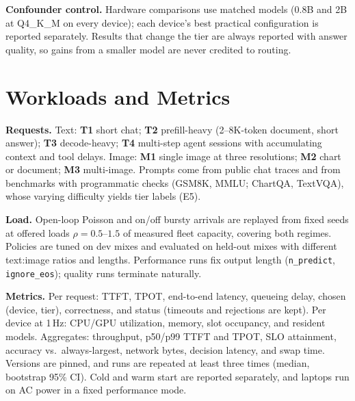 \documentclass[10pt,twocolumn,letterpaper]{article}
\newcommand{\para}[1]{\textbf{#1}\hspace{0.4em}}
\begin{document}
\para{Confounder control.} Hardware comparisons use matched models (0.8B and
2B at Q4\_K\_M on every device); each device's best practical configuration is
reported separately. Results that change the tier are always
reported with answer quality, so gains from a smaller model are never credited
to routing.

\section{Workloads and Metrics}
\para{Requests.} Text: \textbf{T1} short chat; \textbf{T2} prefill-heavy
(2--8K-token document, short answer); \textbf{T3} decode-heavy; \textbf{T4}
multi-step agent sessions with accumulating context and tool delays. Image:
\textbf{M1} single image at three resolutions; \textbf{M2} chart or document;
\textbf{M3} multi-image. Prompts come from public chat traces and from
benchmarks with programmatic checks (GSM8K, MMLU; ChartQA, TextVQA), whose
varying difficulty yields tier labels (E5).

\para{Load.} Open-loop Poisson and on/off bursty arrivals are replayed from
fixed seeds at offered loads $\rho=0.5$--$1.5$ of measured fleet capacity,
covering both regimes. Policies are tuned on dev mixes and evaluated on
held-out mixes with different text:image ratios and lengths. Performance runs
fix output length (\texttt{n\_predict}, \texttt{ignore\_eos}); quality runs
terminate naturally.

\para{Metrics.} Per request: TTFT, TPOT, end-to-end latency, queueing delay,
chosen (device, tier), correctness, and status (timeouts and rejections are
kept). Per device at 1\,Hz: CPU/GPU utilization, memory, slot occupancy, and
resident models. Aggregates: throughput, p50/p99 TTFT and TPOT, SLO
attainment, accuracy vs.\ always-largest, network bytes, decision latency, and
swap time. Versions are pinned, and runs are repeated at least three times
(median, bootstrap 95\% CI). Cold and warm start are reported separately, and
laptops run on AC power in a fixed performance mode.
\end{document}
